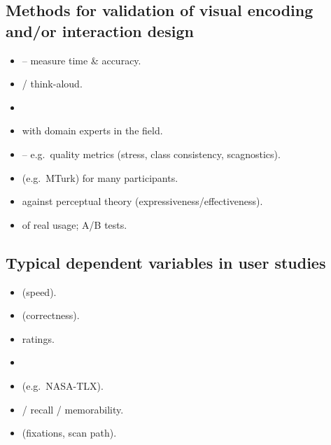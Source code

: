 \subsection{Methods for validation of visual encoding and/or interaction design}
\begin{itemize}[leftmargin=1.4em]
  \item {} -- measure time \& accuracy.
  \item {} / think-aloud.
  \item {}
  \item {} with domain experts in the field.
  \item {} -- e.g.\ quality metrics
        (stress, class consistency, scagnostics).
  \item {} (e.g.\ MTurk) for many participants.
  \item {} against perceptual theory
        (expressiveness/effectiveness).
  \item {} of real usage; A/B tests.
\end{itemize}

\subsection{Typical dependent variables in user studies}
\begin{itemize}[leftmargin=1.4em]
  \item {} (speed).
  \item {} (correctness).
  \item {} ratings.
  \item {}
  \item {} (e.g.\ NASA-TLX).
  \item {} / recall / memorability.
  \item {} (fixations, scan path).
\end{itemize}
